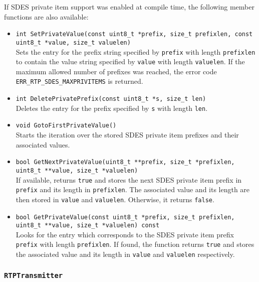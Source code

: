\documentclass[12pt,a4paper]{article}
\newcommand{\headerfile}[1]{\marginpar{\scriptsize Header:\\{\tt #1}}}
\begin{document}
				If SDES private item support was enabled at compile time, the following
				member functions are also available:
				\begin{itemize}
					\item {\tt int SetPrivateValue(const uint8\_t *prefix, size\_t prefixlen, const uint8\_t *value, size\_t valuelen)}\\
						Sets the entry for the prefix string specified by {\tt prefix} with
						length {\tt prefixlen} to contain the value string specified by
						{\tt value} with length {\tt valuelen}. If the maximum allowed
						number of prefixes was reached, the error code
						{\tt ERR\_\-RTP\_\-SDES\_\-MAX\-PRIV\-ITEMS} is returned.
					\item {\tt int DeletePrivatePrefix(const uint8\_t *s, size\_t len)}\\
						Deletes the entry for the prefix specified by {\tt s} with length
						{\tt len}.
					\item {\tt void GotoFirstPrivateValue()}\\
						Starts the iteration over the stored SDES private item prefixes
						and their associated values.
					\item {\tt bool GetNextPrivateValue(uint8\_t **prefix, size\_t *prefixlen, uint8\_t **value, size\_t *valuelen)}\\
						If available, returns {\tt true} and stores the next SDES
						private item prefix in {\tt prefix} and its length in
						{\tt prefixlen}. The associated value and its length are
						then stored in {\tt value} and {\tt valuelen}. Otherwise,
						it returns {\tt false}.
					\item {\tt bool GetPrivateValue(const uint8\_t *prefix, size\_t prefixlen, uint8\_t **value, size\_t *valuelen) const}\\ 
						Looks for the entry which corresponds to the SDES private
						item prefix {\tt prefix} with length {\tt prefixlen}. If found,
						the function returns {\tt true} and stores the associated
						value and its length in {\tt value} and {\tt valuelen}
						respectively.
					\end{itemize}

            \subsubsection{\tt RTPTransmitter}\headerfile{rtptransmitter.h}
\end{document}
